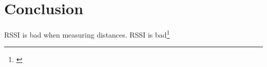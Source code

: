\section{Conclusion}\label{ch:conclusion}


RSSI is bad when measuring distances.
RSSI is bad\footnote{\cite{Heurtefeux2012}}